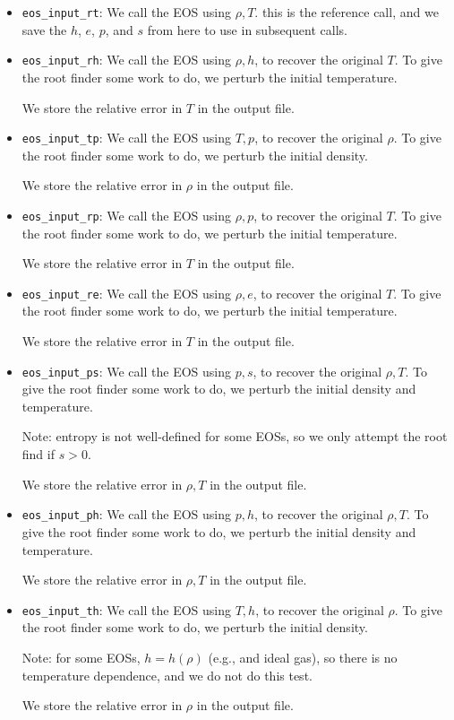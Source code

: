 \begin{itemize}
  \item {\tt eos\_input\_rt}: We call the EOS using $\rho, T$.  this
    is the reference call, and we save the $h$, $e$, $p$, and $s$ from
    here to use in subsequent calls.

  \item {\tt eos\_input\_rh}: We call the EOS using $\rho, h$, to
    recover the original $T$.  To give the root finder some work to
    do, we perturb the initial temperature.  

    We store the relative error in $T$ in the output file.

  \item {\tt eos\_input\_tp}: We call the EOS using $T, p$, to
    recover the original $\rho$.  To give the root finder some work to
    do, we perturb the initial density.

    We store the relative error in $\rho$ in the output file.

  \item {\tt eos\_input\_rp}: We call the EOS using $\rho, p$, to
    recover the original $T$.  To give the root finder some work to
    do, we perturb the initial temperature.

    We store the relative error in $T$ in the output file.

  \item {\tt eos\_input\_re}: We call the EOS using $\rho, e$, to
    recover the original $T$.  To give the root finder some work to
    do, we perturb the initial temperature.

    We store the relative error in $T$ in the output file.

  \item {\tt eos\_input\_ps}: We call the EOS using $p, s$, to
    recover the original $\rho, T$.  To give the root finder some work to
    do, we perturb the initial density and temperature.

    Note: entropy is not well-defined for some EOSs, so we only attempt
    the root find if $s > 0$. 

    We store the relative error in $\rho, T$ in the output file.

  \item {\tt eos\_input\_ph}: We call the EOS using $p, h$, to
    recover the original $\rho, T$.  To give the root finder some work to
    do, we perturb the initial density and temperature.

    We store the relative error in $\rho, T$ in the output file.

  \item {\tt eos\_input\_th}: We call the EOS using $T, h$, to
    recover the original $\rho$.  To give the root finder some work to
    do, we perturb the initial density.

    Note: for some EOSs, $h = h(\rho)$ (e.g., and ideal gas), so there
    is no temperature dependence, and we do not do this test.

    We store the relative error in $\rho$ in the output file.

\end{itemize}

